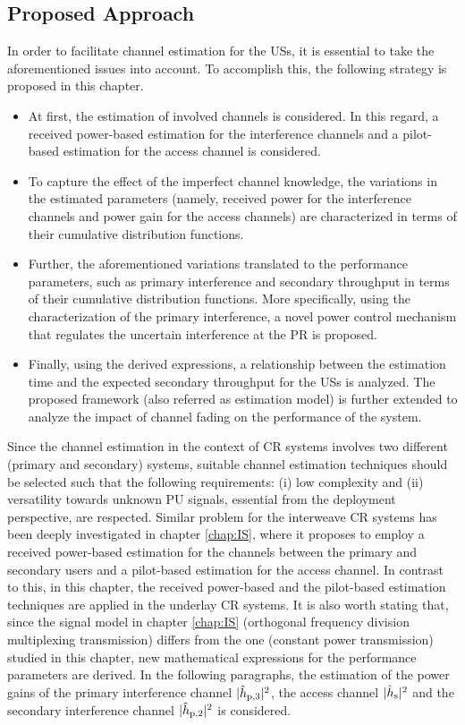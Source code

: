 \subsection{Proposed Approach} 
In order to facilitate channel estimation for the USs, it is essential to take the aforementioned issues into account. To accomplish this, the following strategy is proposed in this chapter.
\begin{itemize}
\item At first, the estimation of involved channels is considered. In this regard, a received power-based estimation for the interference channels and a pilot-based estimation for the access channel is considered. 
\item To capture the effect of the imperfect channel knowledge, the variations in the estimated parameters (namely, received power for the interference channels and power gain for the access channels) are characterized in terms of their cumulative distribution functions.
\item Further, the aforementioned variations translated to the performance parameters, such as primary interference and secondary throughput in terms of their cumulative distribution functions. More specifically, using the characterization of the primary interference, a novel power control mechanism that regulates the uncertain interference at the PR is proposed.  
\item Finally, using the derived expressions, a relationship between the estimation time and the expected secondary throughput for the USs is analyzed. The proposed framework (also referred as estimation model) is further extended to analyze the impact of channel fading on the performance of the system. 
\end{itemize}
Since the channel estimation in the context of CR systems involves two different (primary and secondary) systems, suitable channel estimation techniques should be selected such that the following requirements: (i) low complexity and (ii) versatility towards unknown PU signals, essential from the deployment perspective, are respected. Similar problem for the interweave CR systems has been deeply investigated in chapter \ref{chap:IS}, where it proposes to employ a received power-based estimation for the channels between the primary and secondary users and a pilot-based estimation for the access channel. In contrast to this, in this chapter, the received power-based and the pilot-based estimation techniques are applied in the underlay CR systems. It is also worth stating that, since the signal model in chapter \ref{chap:IS} (orthogonal frequency division multiplexing transmission) differs from the one (constant power transmission) studied in this chapter, new mathematical expressions for the performance parameters are derived. 
In the following paragraphs, the estimation of the power gains of the primary interference channel $|\hat{h}_{\text{p,3}}|^2$, the access channel $|\hat{h}_{\text{s}}|^2$ and the secondary interference channel $|\hat{h}_{\text{p,2}}|^2$ is considered. 
